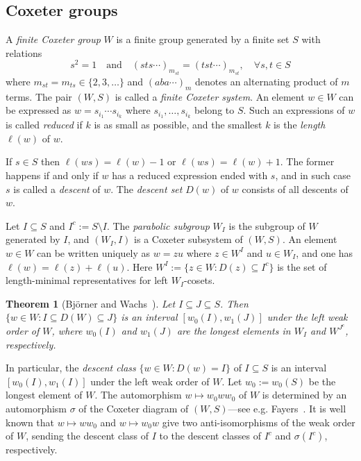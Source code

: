 \documentclass{amsart}
\newtheorem{theorem}{Theorem}[section]
\newtheorem*{Young's Rule}{Young's Rule}
\theoremstyle{definition}
\theoremstyle{remark}
\numberwithin{equation}{section}
\begin{document}
\subsection{Coxeter groups}

A \emph{finite Coxeter group} $W$ is a finite group generated by a finite set $S$ with relations 
\[
s^2=1 \quad \text{and} \quad (sts\cdots)_{m_{st}} = (tst\cdots)_{m_{st}},\quad \forall s,t\in S
\]
where $m_{st} = m_{ts} \in\{2,3,\ldots\}$ and $(aba\cdots)_m$ denotes an alternating product of $m$ terms. The pair $(W,S)$ is called a \emph{finite Coxeter system}. An element $w\in W$ can be expressed as $w=s_{i_1}\cdots s_{i_k}$ where $s_{i_1},\ldots,s_{i_k}$ belong to $S$. Such an expressions of $w$ is called \emph{reduced} if $k$ is as small as possible, and the smallest $k$ is the \emph{length} $\ell(w)$ of $w$.

If $s\in S$ then $\ell(ws)=\ell(w)-1$ or $\ell(ws)=\ell(w)+1$. The former happens if and only if $w$ has a reduced expression ended with $s$, and in such case $s$ is called a \emph{descent} of $w$. The \emph{descent set} $D(w)$ of $w$ consists of all descents of $w$.

Let $I\subseteq S$ and $I^c:=S\setminus I$. The \emph{parabolic subgroup} $W_I$ is the subgroup of $W$ generated by $I$, and $(W_I,I)$ is a Coxeter subsystem of $(W,S)$. 
An element $w\in W$ can be written uniquely as $w = z u$ where $z\in W^I$ and $u\in W_I$, and one has $\ell(w) = \ell(z) + \ell(u)$. Here $W^I:=\{ z\in W: D(z)\subseteq I^c \}$ is the set of length-minimal representatives for left $W_I$-cosets.

\begin{theorem}[{Bj\"orner and Wachs~\cite[Theorem~6.2]{BjornerWachs}}]\label{thm:interval}
Let $I\subseteq J\subseteq S$. Then $\{ w\in W: I\subseteq D(W)\subseteq J\}$ is an interval $[w_0(I),w_1(J)]$ under the left weak order of $W$, where $w_0(I)$ and $w_1(J)$ are the longest elements in $W_{I}$ and $W^{J^c}$, respectively.
\end{theorem}

In particular, the \emph{descent class} $\{w\in W: D(w)=I\}$ of $I\subseteq S$ is an interval $[w_0(I),w_1(I)]$ under the left weak order of $W$. Let $w_0:=w_0(S)$ be the longest element of $W$. The automorphism $w\mapsto w_0ww_0$ of $W$ is determined by an automorphism $\sigma$ of the Coxeter diagram of $(W,S)$---see e.g. Fayers~\cite[Proposition~2.4]{Fayers}. It is well known that $w\mapsto ww_0$ and $w\mapsto w_0w$ give two anti-isomorphisms of the weak order of $W$, sending the descent class of $I$ to the descent classes of $I^c$ and $\sigma(I^c)$, respectively.
\end{document}
